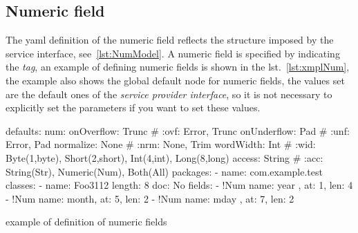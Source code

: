 \subsection{Numeric field} \label{sub:yaml.num}
The yaml definition of the numeric field reflects the structure imposed by the 
service interface, see~\ref{lst:NumModel}. 
A numeric field is specified by indicating the  
 \textsl{tag}, an example of defining
numeric fields is shown in the lst.~\ref{lst:xmplNum}, the example also shows 
the global default node for numeric fields, the values set are the default ones 
of the \textsl{service provider interface}, so it is not necessary to explicitly 
set the parameters if you want to set these values.

\begin{elisting}[!htb]
\begin{yamlcode}
defaults:
  num:
    onOverflow: Trunc   # :ovf: Error, Trunc
    onUnderflow: Pad    # :unf: Error, Pad
    normalize: None     # :nrm: None, Trim
    wordWidth: Int      # :wid: Byte(1,byte), Short(2,short), Int(4,int), Long(8,long)
    access: String      # :acc: String(Str), Numeric(Num), Both(All)
packages:
  - name: com.example.test
    classes:
      - name: Foo3112
        length: 8
        doc: No
        fields:
          - !Num { name: year , at: 1, len: 4 }
          - !Num { name: month, at: 5, len: 2 }
          - !Num { name: mday , at: 7, len: 2 }
\end{yamlcode}
\caption{example of definition of numeric fields}
\label{lst:xmplNum}
\end{elisting}


